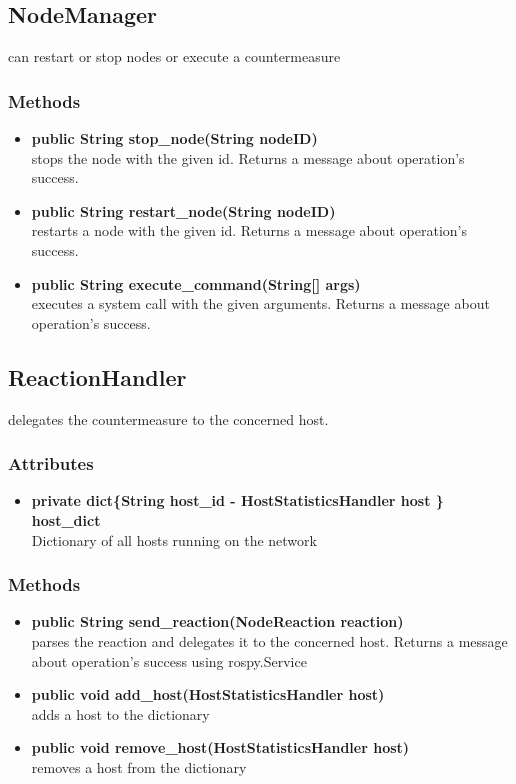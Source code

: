 \subsection{NodeManager}
can restart or stop nodes or execute a countermeasure 

\subsubsection{Methods}
\begin{itemize}
	\item \textbf{public String stop\_node(String nodeID)}\\
	stops the node with the given id.
	Returns a message about operation's success.
	\item \textbf{public String restart\_node(String nodeID)}\\
	restarts a node with the given id.
	Returns a message about operation's success.
	\item \textbf{public String execute\_command(String[] args)}\\
	executes a system call with the given arguments.
	Returns a message about operation's success.
\end{itemize}

\subsection{ReactionHandler}
delegates the countermeasure to the concerned host.

\subsubsection{Attributes}
\begin{itemize}
	\item \textbf{private  dict\{String host\_id  - HostStatisticsHandler host  \} host\_dict}\\
	Dictionary of all hosts running on the network
\end{itemize}

\subsubsection{Methods}
\begin{itemize}
	\item \textbf{public String send\_reaction(NodeReaction reaction)}\\
	parses the reaction and delegates it to the concerned host.
	Returns a message about operation's success using rospy.Service
	\item \textbf{public void add\_host(HostStatisticsHandler host)}\\
	adds a host to the dictionary
	\item \textbf{public void remove\_host(HostStatisticsHandler host)}\\
	removes a host from the dictionary
\end{itemize}
	
